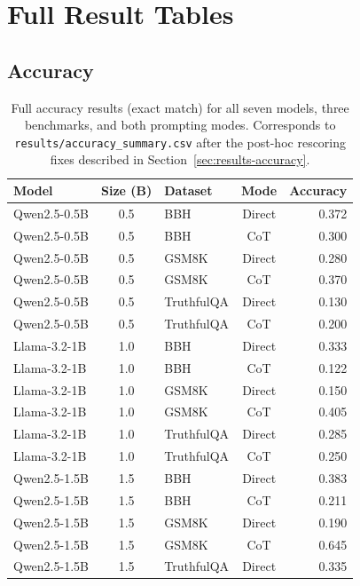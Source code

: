 \documentclass{article}
\begin{document}



\appendix

\section{Full Result Tables}
\label{sec:app-tables}

\subsection{Accuracy}

\begin{longtable}{lclcr}
\caption{Full accuracy results (exact match) for all seven models, three benchmarks, and both prompting modes. Corresponds to \texttt{results/accuracy\_summary.csv} after the post-hoc rescoring fixes described in Section~\ref{sec:results-accuracy}.} \label{tab:full-accuracy} \\
\toprule
Model & Size (B) & Dataset & Mode & Accuracy \\
\midrule
\endhead
\bottomrule
\endfoot
Qwen2.5-0.5B & 0.5 & BBH & Direct & 0.372 \\
Qwen2.5-0.5B & 0.5 & BBH & CoT & 0.300 \\
Qwen2.5-0.5B & 0.5 & GSM8K & Direct & 0.280 \\
Qwen2.5-0.5B & 0.5 & GSM8K & CoT & 0.370 \\
Qwen2.5-0.5B & 0.5 & TruthfulQA & Direct & 0.130 \\
Qwen2.5-0.5B & 0.5 & TruthfulQA & CoT & 0.200 \\
Llama-3.2-1B & 1.0 & BBH & Direct & 0.333 \\
Llama-3.2-1B & 1.0 & BBH & CoT & 0.122 \\
Llama-3.2-1B & 1.0 & GSM8K & Direct & 0.150 \\
Llama-3.2-1B & 1.0 & GSM8K & CoT & 0.405 \\
Llama-3.2-1B & 1.0 & TruthfulQA & Direct & 0.285 \\
Llama-3.2-1B & 1.0 & TruthfulQA & CoT & 0.250 \\
Qwen2.5-1.5B & 1.5 & BBH & Direct & 0.383 \\
Qwen2.5-1.5B & 1.5 & BBH & CoT & 0.211 \\
Qwen2.5-1.5B & 1.5 & GSM8K & Direct & 0.190 \\
Qwen2.5-1.5B & 1.5 & GSM8K & CoT & 0.645 \\
Qwen2.5-1.5B & 1.5 & TruthfulQA & Direct & 0.335 \\

\end{longtable}
\end{document}
